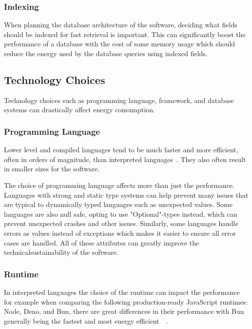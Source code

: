  \subsubsection{Indexing}
 When planning the database architecture of the software, deciding what fields should be indexed for fast retrieval is important. This can significantly boost the performance of a database with the cost of some memory usage which should reduce the energy used by the database queries using indexed fields.

\subsection{Technology Choices}\label{technology}
Technology choices such as programming language, framework, and database systems can drastically affect energy consumption.

\subsubsection{Programming Language}
 Lower level and compiled languages tend to be much faster and more efficient, often in orders of magnitude, than interpreted languages~\cite{PEREIRA2021102609}\cite{10.1145/3136014.3136031}\cite{10.1145/3125374.3125382}. They also often result in smaller sizes for the software.

The choice of programming language affects more than just the performance. Languages with strong and static type systems can help prevent many issues that are typical to dynamically typed languages such as unexpected values. Some languages are also null safe, opting to use "Optional"-types instead, which can prevent unexpected crashes and other issues. Similarly, some languages handle errors as values instead of exceptions which makes it easier to ensure all error cases are handled. All of these attributes can greatly improve the \gls{technicalsustainability} of the software.

\subsubsection{Runtime}\label{runtime}
In interpreted languages the choice of the runtime can impact the performance for example when comparing the following production-ready JavaScript runtimes: Node, Deno, and Bun, there are great differences in their performance with Bun generally being the fastest and most energy efficient~\cite{snykNodejsDeno}~\cite{bunvsnodevsdeno}.

